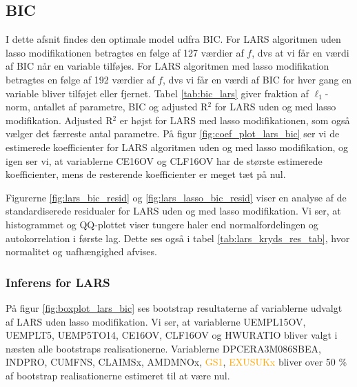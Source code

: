 \subsection{BIC}
I dette afsnit findes den optimale model udfra BIC.
For LARS algoritmen uden lasso modifikationen betragtes en følge af 127 værdier af $f$, dvs at vi får en værdi af BIC når en variable tilføjes.
For LARS algoritmen med lasso modifikation betragtes en følge af 192 værdier af $f$, dvs vi får en værdi af BIC for hver gang en variable bliver tilføjet eller fjernet. 
Tabel \ref{tab:bic_lars} giver fraktion af \(\ell_1\)-norm, antallet af parametre, BIC og adjusted R$^2$ for LARS uden og med lasso modifikation. 
Adjusted R$^2$ er højst for LARS med lasso modifikationen, som også vælger det færreste antal parametre. 
På figur \ref{fig:coef_plot_lars_bic} ser vi de estimerede koefficienter for LARS algoritmen uden og med lasso modifikation, og igen ser vi, at variablerne \textcolor{blue3}{CE16OV} og \textcolor{blue3}{CLF16OV} har de største estimerede koefficienter, mens de resterende koefficienter er meget tæt på nul. 




Figurerne \ref{fig:lars_bic_resid} og  \ref{fig:lars_lasso_bic_resid} viser en analyse af de standardiserede residualer for LARS uden og med lasso modifikation. 
Vi ser, at histogrammet og QQ-plottet viser tungere haler end normalfordelingen og autokorrelation i første lag. 
Dette ses også i tabel \ref{tab:lars_kryds_res_tab}, hvor normalitet og uafhængighed afvises.


\subsubsection{Inferens for LARS}
På figur \ref{fig:boxplot_lars_bic} ses bootstrap resultaterne af variablerne udvalgt af LARS uden lasso modifikation. 
Vi ser, at variablerne \textcolor{blue3}{UEMPL15OV}, \textcolor{blue3}{UEMPLT5}, \textcolor{blue3}{UEMP5TO14}, \textcolor{blue3}{CE16OV}, \textcolor{blue3}{CLF16OV} og \textcolor{blue3}{HWURATIO} bliver valgt i næsten alle bootstraps realisationerne.
Variablerne \textcolor{red3}{DPCERA3M086SBEA}, \textcolor{chartreuse4}{INDPRO}, \textcolor{chartreuse4}{CUMFNS}, \textcolor{blue3}{CLAIMSx}, \textcolor{red3}{AMDMNOx}, \textcolor{orange}{GS1}, \textcolor{orange}{EXUSUKx}  bliver over 50 \% af bootstrap realisationerne estimeret til at være nul.  

